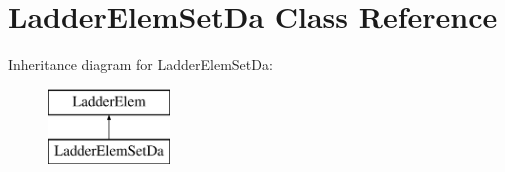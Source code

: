 \hypertarget{class_ladder_elem_set_da}{\section{Ladder\-Elem\-Set\-Da Class Reference}
\label{class_ladder_elem_set_da}
}
Inheritance diagram for Ladder\-Elem\-Set\-Da\-:\begin{figure}[H]
\begin{center}
\leavevmode
\includegraphics[height=2.000000cm]{class_ladder_elem_set_da}
\end{center}
\end{figure}
